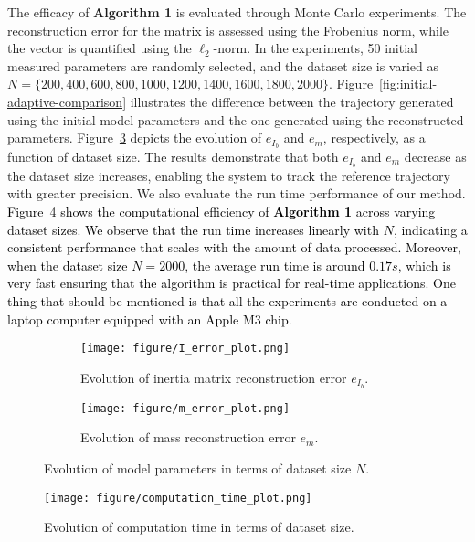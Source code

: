 \documentclass[lettersize,journal]{IEEEtran}
\begin{document}
The efficacy of \textbf{Algorithm 1} is evaluated through Monte Carlo experiments. The reconstruction error for the matrix is assessed using the Frobenius norm, while the vector is quantified using the \( \ell_2 \)-norm. In the experiments, 50 initial measured parameters are randomly selected, and the dataset size is varied as \( N = \{200, 400, 600, 800, 1000, 1200, 1400, 1600, 1800, 2000\} \). Figure~\ref{fig:initial-adaptive-comparison} illustrates the difference between the trajectory generated using the initial model parameters and the one generated using the reconstructed parameters. Figure~\ref{fig:evolution of I m}  depicts the evolution of \( e_{I_b} \) and \( e_{m} \), respectively, as a function of dataset size. The results demonstrate that both \( e_{I_b} \) and \( e_{m} \) decrease as the dataset size increases, enabling the system to track the reference trajectory with greater precision. We also evaluate the run time performance of our method. \textcolor{black}{Figure~\ref{fig:evolution compilation time} shows the computational efficiency of \textbf{Algorithm 1} across varying dataset sizes. We observe that the run time increases linearly with $N$, indicating a consistent performance that scales with the amount of data processed. Moreover, when the dataset size $N=2000$, the average run time is around $0.17s$, which is very fast ensuring that the algorithm is practical for real-time applications. One thing that should be mentioned is that all the experiments are conducted on a laptop computer equipped with an Apple M3 chip.}

\begin{figure}[t]
      \centering
	   \begin{subfigure}{0.9\linewidth} \label{evolution I}
		\texttt{[image: figure/I\_error\_plot.png]}
		\caption{Evolution of inertia matrix reconstruction error $e_{I_b}$.}

	   \end{subfigure}
    \quad
	   \begin{subfigure}{0.9\linewidth} \label{evolution m}
		\texttt{[image: figure/m\_error\_plot.png]}
		\caption{Evolution of mass reconstruction error $e_{m}$.}

	    \end{subfigure}
     \caption{Evolution of model parameters in terms of dataset size $N$.}
     \label{fig:evolution of I m}
    \end{figure}

\begin{figure}[t]
	\centering
	\texttt{[image: figure/computation\_time\_plot.png]}
	\caption{Evolution of computation time in terms of dataset size.}
	\label{fig:evolution compilation time}
\end{figure}
\end{document}
